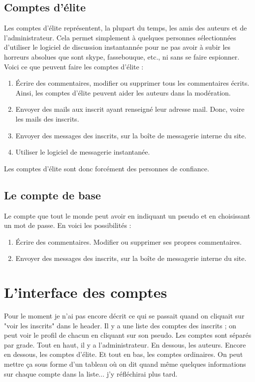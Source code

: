 \documentclass[french]{report}
\theoremstyle{plain}
\begin{document}
		\subsection{Comptes d'élite}
			Les comptes d'élite représentent, la plupart du temps, les amis des auteurs et de l'administrateur. Cela permet simplement à quelques personnes sélectionnées d'utiliser le logiciel de discussion instantannée pour ne pas avoir à subir les horreurs absolues que sont skype, fassebouque, etc., ni sans se faire espionner. Voici ce que peuvent faire les comptes d'élite :
			\begin{enumerate}
				\item Écrire des commentaires, modifier ou supprimer tous les commentaires écrits. Ainsi, les comptes d'élite peuvent aider les auteurs dans la modération. 
				\item Envoyer des mails aux inscrit ayant renseigné leur adresse mail. Donc, voire les mails des inscrits.
				\item Envoyer des messages des inscrits, sur la boîte de messagerie interne du site.
				\item Utiliser le logiciel de messagerie instantanée.
			\end{enumerate}
			Les comptes d'élite sont donc forcément des personnes de confiance.

		\subsection{Le compte de base}
			Le compte que tout le monde peut avoir en indiquant un pseudo et en choisissant un mot de passe. En voici les possibilités :
			\begin{enumerate}
				\item Écrire des commentaires. Modifier ou supprimer ses propres commentaires.
				\item Envoyer des messages des inscrits, sur la boîte de messagerie interne du site. 
			\end{enumerate}


	\section{L'interface des comptes}
		Pour le moment je n'ai pas encore décrit ce qui se passait quand on cliquait sur "voir les inscrits" dans le header. Il y a une liste des comptes des inscrits ; on peut voir le profil de chacun en cliquant sur son pseudo. Les comptes sont séparés par grade. Tout en haut, il y a l'administrateur. En dessous, les auteurs. Encore en dessous, les comptes d'élite. Et tout en bas, les comptes ordinaires.
		On peut mettre ça sous forme d'un tableau où on dit quand même quelques informations sur chaque compte dans la liste... j'y réfléchirai plus tard. 
\end{document}
